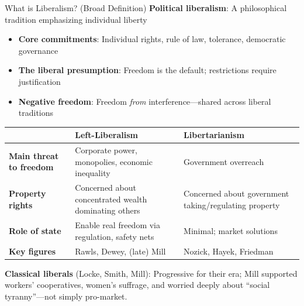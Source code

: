 ﻿\documentclass[aspectratio=169]{beamer}
\begin{document}
\begin{frame}{What is Liberalism? (Broad Definition)}
\textbf{Political liberalism}: A philosophical tradition emphasizing individual liberty

\begin{itemize}
    \item \textbf{Core commitments}: Individual rights, rule of law, tolerance, democratic governance
    \item \textbf{The liberal presumption}: Freedom is the default; restrictions require justification
    \item \textbf{Negative freedom}: Freedom \textit{from} interference---shared across liberal traditions
\end{itemize}

\vspace{0.2cm}
\begin{table}[h]
\centering
\small
\begin{tabular}{>{\bfseries}l p{4.5cm} p{4.5cm}}
\toprule
& \textbf{Left-Liberalism} & \textbf{Libertarianism} \\
\midrule
Main threat to freedom & Corporate power, monopolies, economic inequality & Government overreach \\
Property rights & Concerned about concentrated wealth dominating others & Concerned about government taking/regulating property \\
Role of state & Enable real freedom via regulation, safety nets & Minimal; market solutions \\
Key figures & Rawls, Dewey, (late) Mill & Nozick, Hayek, Friedman \\
\bottomrule
\end{tabular}
\end{table}

\vspace{0.1cm}
\textbf{Classical liberals} (Locke, Smith, Mill): Progressive for their era; Mill supported workers' cooperatives, women's suffrage, and worried deeply about ``social tyranny''---not simply pro-market.
\end{frame}
\end{document}
